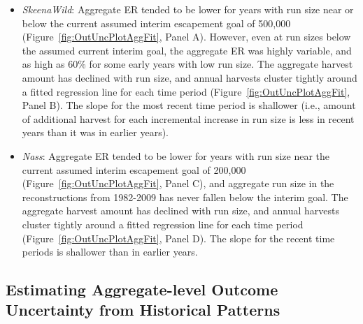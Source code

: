 \documentclass[french,11pt]{book}
\begin{document}
\begin{itemize}

\item
  \emph{SkeenaWild}: Aggregate ER tended to be lower for years with run size near or below the current assumed interim escapement goal of 500,000 (Figure~\ref{fig:OutUncPlotAggFit}, Panel A). However, even at run sizes below the assumed current interim goal, the aggregate ER was highly variable, and as high as 60\% for some early years with low run size. The aggregate harvest amount has declined with run size, and annual harvests cluster tightly around a fitted regression line for each time period (Figure~\ref{fig:OutUncPlotAggFit}, Panel B). The slope for the most recent time period is shallower (i.e., amount of additional harvest for each incremental increase in run size is less in recent years than it was in earlier years).
\item
  \emph{Nass}: Aggregate ER tended to be lower for years with run size near the current assumed interim escapement goal of 200,000 (Figure~\ref{fig:OutUncPlotAggFit}, Panel C), and aggregate run size in the reconstructions from 1982-2009 has never fallen below the interim goal. The aggregate harvest amount has declined with run size, and annual harvests cluster tightly around a fitted regression line for each time period (Figure~\ref{fig:OutUncPlotAggFit}, Panel D). The slope for the recent time periods is shallower than in earlier years.
\end{itemize}
\subsection{Estimating Aggregate-level Outcome Uncertainty from Historical Patterns}\label{estimating-aggregate-level-outcome-uncertainty-from-historical-patterns}
\end{document}
